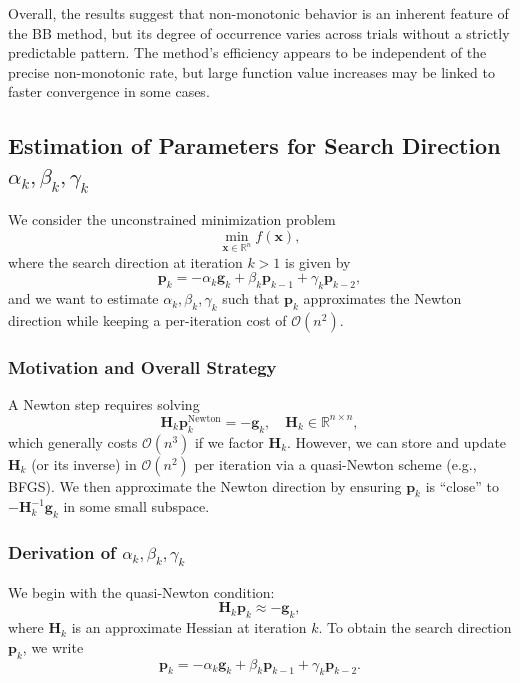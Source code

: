 \documentclass[12pt]{article}
\begin{document}
\smallskip

Overall, the results suggest that non-monotonic behavior is an inherent feature of the BB method, but its degree of occurrence varies across trials without a strictly predictable pattern. The method's efficiency appears to be independent of the precise non-monotonic rate, but large function value increases may be linked to faster convergence in some cases.

\clearpage
\newpage


\subsection{Estimation of Parameters for Search Direction \texorpdfstring{\(\alpha_k, \beta_k, \gamma_k\)}{}}

We consider the unconstrained minimization problem
\[
\min_{\mathbf{x} \in \mathbb{R}^n} f(\mathbf{x}),
\]
where the search direction at iteration \(k > 1\) is given by
\[
\mathbf{p}_k = -\alpha_k \mathbf{g}_k + \beta_k \mathbf{p}_{k-1} + \gamma_k \mathbf{p}_{k-2},
\]
and we want to estimate \(\alpha_k, \beta_k, \gamma_k\) such that \(\mathbf{p}_k\) approximates the Newton direction while keeping a per-iteration cost of \(\mathcal{O}(n^2)\).

\subsubsection{Motivation and Overall Strategy}

A Newton step requires solving
\[
\mathbf{H}_k \mathbf{p}_k^{\text{Newton}} = -\mathbf{g}_k, \quad \mathbf{H}_k \in \mathbb{R}^{n \times n},
\]
which generally costs \(\mathcal{O}(n^3)\) if we factor \(\mathbf{H}_k\). However, we can store and update \(\mathbf{H}_k\) (or its inverse) in \(\mathcal{O}(n^2)\) per iteration via a quasi-Newton scheme (e.g., BFGS). We then approximate the Newton direction by ensuring \(\mathbf{p}_k\) is “close” to \(- \mathbf{H}_k^{-1} \mathbf{g}_k\) in some small subspace.

\subsubsection{Derivation of \texorpdfstring{\(\alpha_k, \beta_k, \gamma_k\)}{}}

We begin with the quasi-Newton condition:
\[
\mathbf{H}_k \mathbf{p}_k \approx -\mathbf{g}_k,
\]
where \(\mathbf{H}_k\) is an approximate Hessian at iteration \(k\). To obtain the search direction \(\mathbf{p}_k\), we write
\[
\mathbf{p}_k = -\alpha_k \mathbf{g}_k + \beta_k \mathbf{p}_{k-1} + \gamma_k \mathbf{p}_{k-2}.
\]
\end{document}
